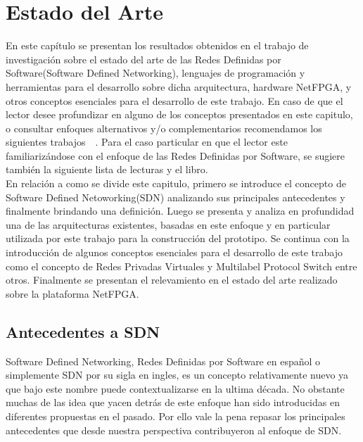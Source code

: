 
\chapter{Estado del Arte}  %

\ifpdf
    \graphicspath{{Chapter2/Figs/Raster/}{Chapter2/Figs/PDF/}{Chapter2/Figs/}}
\else
    \graphicspath{{Chapter2/Figs/Vector/}{Chapter2/Figs/}}
\fi

En este capítulo se presentan los resultados obtenidos en el trabajo de investigación sobre el estado
del arte de las Redes Definidas por Software(Software Defined Networking), lenguajes
de programación y herramientas para el desarrollo sobre dicha arquitectura, hardware NetFPGA, y otros conceptos esenciales para el desarrollo de este trabajo. En caso de que el lector desee profundizar en alguno de los conceptos presentados en este capitulo, o consultar enfoques alternativos
y/o complementarios recomendamos los siguientes trabajos~\citep{StateOfArt1}~\citep{StateOfArt2}. Para el caso particular en que el lector este familiarizándose con el enfoque de las Redes Definidas por Software, se sugiere también la siguiente lista de lecturas\citep{SDNReadingList} y el libro\citep{SDNBook1}.\\

En relación a como se divide este capitulo, primero se introduce el concepto de Software Defined Netoworking(SDN) analizando sus principales antecedentes y finalmente brindando una definición. Luego se presenta y analiza en profundidad una de las arquitecturas existentes, basadas en este enfoque y en particular utilizada por este trabajo para la construcción del prototipo. Se continua con la introducción de algunos conceptos esenciales para el desarrollo de este trabajo como el concepto de Redes Privadas Virtuales y Multilabel Protocol Switch entre otros. Finalmente se presentan el relevamiento en el estado del arte realizado sobre la plataforma NetFPGA.  

\section{Antecedentes a SDN} %
Software Defined Networking, Redes Definidas por Software en español o simplemente SDN por su sigla en ingles, es un concepto relativamente nuevo ya que bajo este nombre puede contextualizarse en la ultima década. No obstante muchas de las idea que yacen detrás de este enfoque han sido introducidas en diferentes propuestas en el pasado. Por ello vale la pena repasar los principales antecedentes que desde nuestra perspectiva contribuyeron al enfoque de SDN. 

